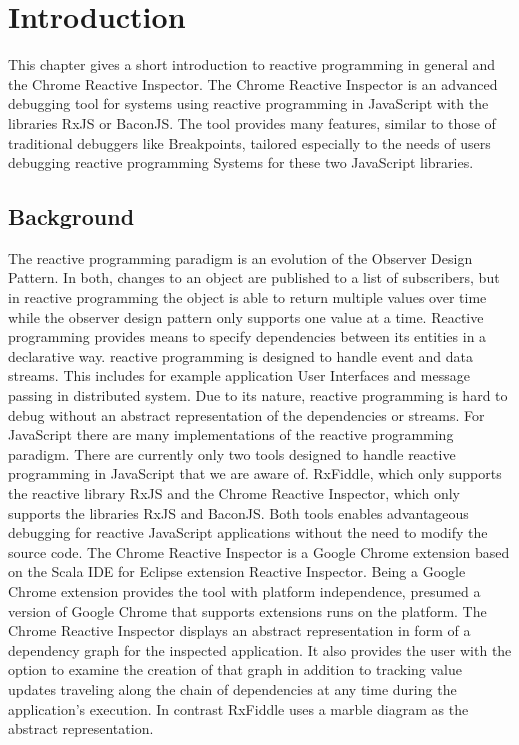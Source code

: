 \chapter{Introduction} \label{ch:Introduction}
This chapter gives a short introduction to reactive programming in general and the Chrome Reactive Inspector. The Chrome Reactive Inspector is an advanced debugging tool for systems using reactive programming in JavaScript with the libraries RxJS or BaconJS. The tool provides many features, similar to those of traditional debuggers like Breakpoints, tailored especially to the needs of users debugging reactive programming Systems for these two JavaScript libraries.

\section{Background}
The reactive programming paradigm is an evolution of the Observer Design Pattern. In both, changes to an object are published to a list of subscribers, but in reactive programming the object is able to return multiple values over time while the observer design pattern only supports one value at a time. Reactive programming provides means to specify dependencies between its entities in a declarative way. reactive programming is designed to handle event and data streams. This includes for example application User Interfaces and message passing in distributed system. Due to its nature, reactive programming is hard to debug without an abstract representation of the dependencies or streams.
For JavaScript there are many implementations of the reactive programming paradigm. There are currently only two tools designed to handle reactive programming in JavaScript that we are aware of. RxFiddle, which only supports the reactive library RxJS and the Chrome Reactive Inspector, which only supports the libraries RxJS and BaconJS. Both tools enables advantageous debugging for reactive JavaScript applications without the need to modify the source code. The Chrome Reactive Inspector is a Google Chrome extension based on the Scala IDE for Eclipse extension Reactive Inspector. Being a Google Chrome extension provides the tool with platform independence, presumed a version of Google Chrome that supports extensions runs on the platform.
The Chrome Reactive Inspector displays an abstract representation in form of a dependency graph for the inspected application. It also provides the user with the option to examine the creation of that graph in addition to tracking value updates traveling along the chain of dependencies at any time during the application's execution. In contrast RxFiddle uses a marble diagram as the abstract representation.


